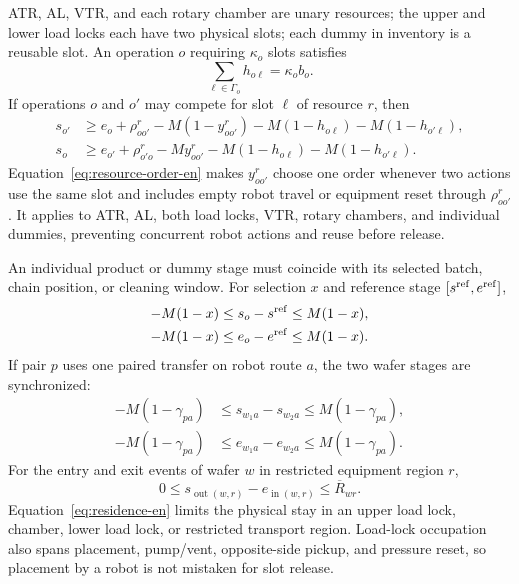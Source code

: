 \documentclass[journal]{IEEEtran}
\begin{document}
ATR, AL, VTR, and each rotary chamber are unary resources; the upper and lower load locks each have two physical slots; each dummy in inventory is a reusable slot. An operation $o$ requiring $\kappa_o$ slots satisfies
\begin{equation}
\sum_{\ell\in\Gamma_o}h_{o\ell}=\kappa_ob_o.
\label{eq:slot-select-en}
\end{equation}
If operations $o$ and $o'$ may compete for slot $\ell$ of resource $r$, then
\begin{equation}
\begin{aligned}
s_{o'}&\ge e_o+\rho^r_{oo'}-M(1-y^r_{oo'})
-M(1-h_{o\ell})-M(1-h_{o'\ell}),\\
s_o&\ge e_{o'}+\rho^r_{o'o}-My^r_{oo'}
-M(1-h_{o\ell})-M(1-h_{o'\ell}).
\end{aligned}
\label{eq:resource-order-en}
\end{equation}
Equation~\eqref{eq:resource-order-en} makes $y^r_{oo'}$ choose one order whenever two actions use the same slot and includes empty robot travel or equipment reset through $\rho^r_{oo'}$. It applies to ATR, AL, both load locks, VTR, rotary chambers, and individual dummies, preventing concurrent robot actions and reuse before release.

An individual product or dummy stage must coincide with its selected batch, chain position, or cleaning window. For selection $x$ and reference stage $[s^{\rm ref},e^{\rm ref}]$,
\begin{equation}
\begin{aligned}
-M(1-x)&\le s_o-s^{\rm ref}\le M(1-x),\\
-M(1-x)&\le e_o-e^{\rm ref}\le M(1-x).
\end{aligned}
\label{eq:stage-link-en}
\end{equation}
If pair $p$ uses one paired transfer on robot route $a$, the two wafer stages are synchronized:
\begin{equation}
\begin{aligned}
-M(1-\gamma_{pa})&\le s_{w_1a}-s_{w_2a}\le M(1-\gamma_{pa}),\\
-M(1-\gamma_{pa})&\le e_{w_1a}-e_{w_2a}\le M(1-\gamma_{pa}).
\end{aligned}
\label{eq:double-transfer-en}
\end{equation}
For the entry and exit events of wafer $w$ in restricted equipment region $r$,
\begin{equation}
0\le s_{\operatorname{out}(w,r)}-e_{\operatorname{in}(w,r)}
\le\overline R_{wr}.
\label{eq:residence-en}
\end{equation}
Equation~\eqref{eq:residence-en} limits the physical stay in an upper load lock, chamber, lower load lock, or restricted transport region. Load-lock occupation also spans placement, pump/vent, opposite-side pickup, and pressure reset, so placement by a robot is not mistaken for slot release.
\end{document}
